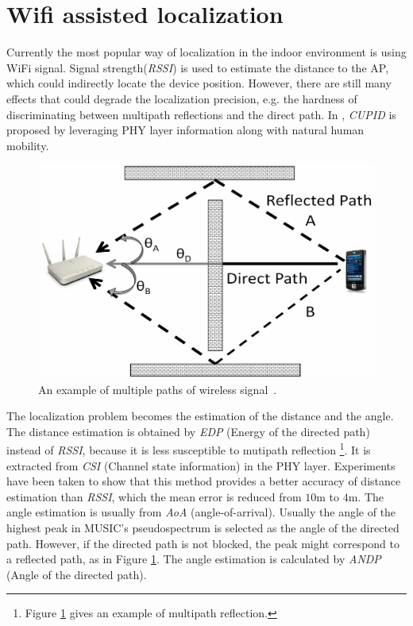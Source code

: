\documentclass[letterpaper]{article}
\begin{document}
\section{Wifi assisted localization}

Currently the most popular way of localization in the indoor environment is using WiFi signal. 
Signal strength(\emph{RSSI}) is used to estimate the distance to the AP, which could indirectly locate the device position.
However, there are still many effects that could degrade the localization precision, e.g. the hardness of discriminating between multipath reflections and the direct path.
In \cite{Nirjon:2014:CIL:2594368.2594378}, \emph{CUPID} is proposed by leveraging PHY layer information along with natural human mobility.
\begin{figure}
	\centering
	\includegraphics[width=0.7\linewidth]{fig/multipath.png}
	\caption{An example of multiple paths of wireless signal~\cite{Sen:2013:AMR:2462456.2464463}.}
	\label{fig:multipath}
\end{figure}
The localization problem becomes the estimation of the distance and the angle.
The distance estimation is obtained by \emph{EDP} (Energy of the directed path) instead of \emph{RSSI}, because it is less susceptible to mutipath reflection
\footnote{Figure \ref{fig:multipath} gives an example of multipath reflection.}.
It is extracted from \emph{CSI} (Channel state information) in the PHY layer. 
Experiments have been taken to show that this method provides a better accuracy of distance estimation than \emph{RSSI}, which the mean error is reduced from $ 10 $m to $ 4 $m.
The angle estimation is usually from \emph{AoA} (angle-of-arrival).
Usually the angle of the highest peak in MUSIC's pseudospectrum is selected as the angle of the directed path.
However, if the directed path is not blocked, the peak might correspond to a reflected path, as in Figure \ref{fig:multipath}.
The angle estimation is calculated by \emph{ANDP} (Angle of the directed path).
\end{document}
